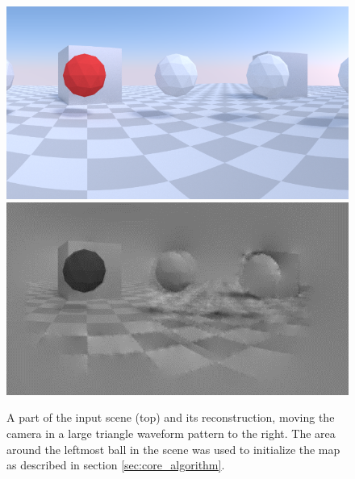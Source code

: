 \begin{figure}
\includegraphics[width=\columnwidth]{images/zigzag_input.png}
\includegraphics[width=\columnwidth]{images/zigzag_reconstruction.png}
\caption{A part of the input scene (top) and its reconstruction,
moving the camera in a large triangle waveform pattern to the right.
The area around the leftmost ball in the scene was used to initialize
the map as described in section \ref{sec:core_algorithm}.}
\label{fig:zigzag_reconstruction}
\end{figure}
